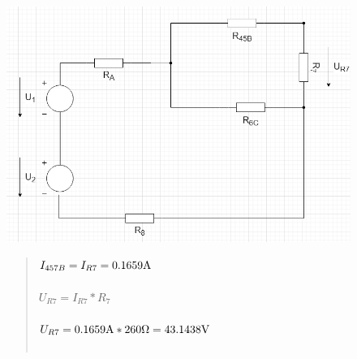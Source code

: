 \begin{figure}[H]
    \centering
    \includegraphics[scale=0.5]{picturesFor1Uloha/11.png}
    \begin{quote}
        \centering
         $I_{457B} = I_{R7} = 0.1659\Am $ \\~\\
         $U_{R7} = I_{R7} * R_{7}$ \\~\\
         $U_{R7} = 0.1659\Am * 260\Omega = 43.1438\Vo$ \\~\\
    \end{quote}
\end{figure}